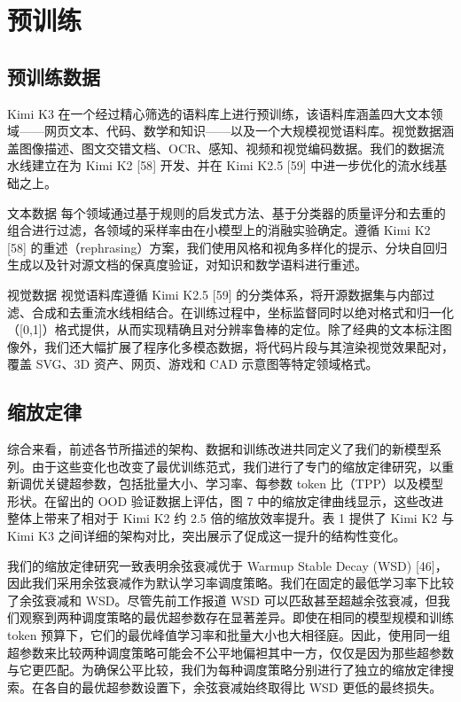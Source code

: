 \section{预训练}\label{pre-training}

\subsection{预训练数据}\label{pre-training-data}

Kimi K3 在一个经过精心筛选的语料库上进行预训练，该语料库涵盖四大文本领域——网页文本、代码、数学和知识——以及一个大规模视觉语料库。视觉数据涵盖图像描述、图文交错文档、OCR、感知、视频和视觉编码数据。我们的数据流水线建立在为 Kimi K2 {[}58{]} 开发、并在 Kimi K2.5 {[}59{]} 中进一步优化的流水线基础之上。

文本数据 每个领域通过基于规则的启发式方法、基于分类器的质量评分和去重的组合进行过滤，各领域的采样率由在小模型上的消融实验确定。遵循 Kimi K2 {[}58{]} 的重述（rephrasing）方案，我们使用风格和视角多样化的提示、分块自回归生成以及针对源文档的保真度验证，对知识和数学语料进行重述。

视觉数据 视觉语料库遵循 Kimi K2.5 {[}59{]} 的分类体系，将开源数据集与内部过滤、合成和去重流水线相结合。在训练过程中，坐标监督同时以绝对格式和归一化（{[}0,1{]}）格式提供，从而实现精确且对分辨率鲁棒的定位。除了经典的文本标注图像外，我们还大幅扩展了程序化多模态数据，将代码片段与其渲染视觉效果配对，覆盖 SVG、3D 资产、网页、游戏和 CAD 示意图等特定领域格式。

\subsection{缩放定律}\label{scaling-law}

综合来看，前述各节所描述的架构、数据和训练改进共同定义了我们的新模型系列。由于这些变化也改变了最优训练范式，我们进行了专门的缩放定律研究，以重新调优关键超参数，包括批量大小、学习率、每参数 token 比（TPP）以及模型形状。在留出的 OOD 验证数据上评估，图 7 中的缩放定律曲线显示，这些改进整体上带来了相对于 Kimi K2 约 2.5 倍的缩放效率提升。表 1 提供了 Kimi K2 与 Kimi K3 之间详细的架构对比，突出展示了促成这一提升的结构性变化。

我们的缩放定律研究一致表明余弦衰减优于 Warmup Stable Decay (WSD) {[}46{]}，因此我们采用余弦衰减作为默认学习率调度策略。我们在固定的最低学习率下比较了余弦衰减和 WSD。尽管先前工作报道 WSD 可以匹敌甚至超越余弦衰减，但我们观察到两种调度策略的最优超参数存在显著差异。即使在相同的模型规模和训练 token 预算下，它们的最优峰值学习率和批量大小也大相径庭。因此，使用同一组超参数来比较两种调度策略可能会不公平地偏袒其中一方，仅仅是因为那些超参数与它更匹配。为确保公平比较，我们为每种调度策略分别进行了独立的缩放定律搜索。在各自的最优超参数设置下，余弦衰减始终取得比 WSD 更低的最终损失。

